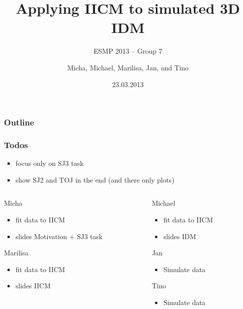 \documentclass[xcolor={fixpdftex,hyperref,x11names},10pt,pdftex,hyperref={pdftex}]{beamer}
\title{Applying IICM to simulated 3D IDM}
\subtitle{ESMP 2013 -- Group 7}
\author{Micha, Michael, Marilisa, Jan, and Tino}
\institute{European Union -- Oulanka Research Station}
\date{23.03.2013}
\begin{document}
\maketitle

\begin{frame}
  \frametitle{Outline}
  \tableofcontents
\end{frame}

\begin{frame}
  \frametitle{Todos}
  \begin{itemize}
      \item focus only on SJ3 task
      \item show SJ2 and TOJ in the end (and there only plots)
  \end{itemize}
  \begin{columns}[t]
      \begin{column}{0.5\textwidth}
  \begin{block}{Micha}
      \begin{itemize}
          \item fit data to IICM
          \item slides Motivation + SJ3 task
      \end{itemize}
  \end{block}
  \begin{block}{Marilisa}
      \begin{itemize}
          \item fit data to IICM
          \item slides IICM
      \end{itemize}
  \end{block}
      \end{column}
      \begin{column}{0.5\textwidth}
  \begin{block}{Michael}
      \begin{itemize}
          \item fit data to IICM
          \item slides IDM
      \end{itemize}
  \end{block}
  \begin{block}{Jan}
      \begin{itemize}
          \item Simulate data
      \end{itemize}
  \end{block}
  \begin{block}{Tino}
      \begin{itemize}
          \item Simulate data
      \end{itemize}
  \end{block}
    \end{column}
  \end{columns}
\end{frame}
\end{document}
